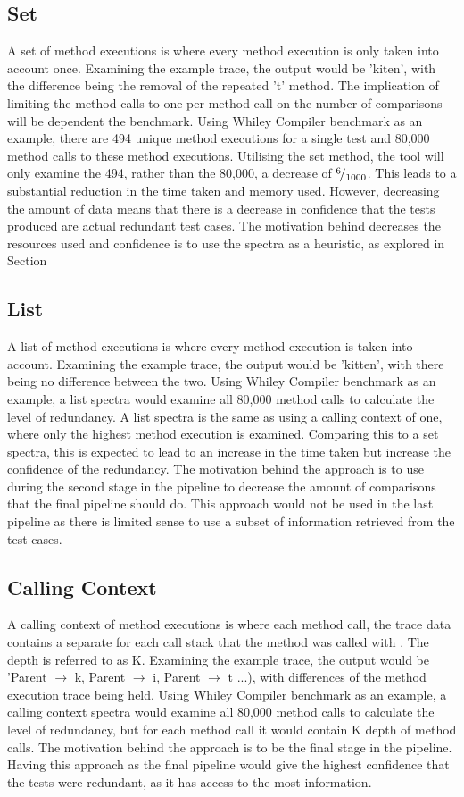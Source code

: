 \subsection{Set}
A set of method executions is where every method execution is only taken into account once. Examining the example trace, the output would be 'kiten', with the difference being the removal of the repeated 't' method. The implication of limiting the method calls to one per method call on the number of comparisons will be dependent the benchmark. Using Whiley Compiler benchmark as an example, there are 494 unique method executions for a single test and 80,000 method calls to these method executions. Utilising the set method, the tool will only examine the 494, rather than the 80,000, a decrease of ${}^{6}\!/_{1000}$. This leads to a substantial reduction in the time taken and memory used. However, decreasing the amount of data means that there is a decrease in confidence that the tests produced are actual redundant test cases. The motivation behind decreases the resources used and confidence is to use the spectra as a heuristic, as explored in Section 

\subsection{List}
A list of method executions is where every method execution is taken into account. Examining the example trace, the output would be 'kitten', with there being no difference between the two. Using Whiley Compiler benchmark as an example, a list spectra would examine all 80,000 method calls to calculate the level of redundancy. A list spectra is the same as using a calling context of one, where only the highest method execution is examined. Comparing this to a set spectra, this is expected to lead to an increase in the time taken but increase the confidence of the redundancy. The motivation behind the approach is to use during the second stage in the pipeline to decrease the amount of comparisons that the final pipeline should do. This approach would not be used in the last pipeline as there is limited sense to use a subset of information retrieved from the test cases.

\subsection{Calling Context}
A calling context of method executions is where each method call, the trace data contains a separate  for each call stack that the method was called with \cite{callingcontext}. The depth is referred to as K. Examining the example trace, the output would be 'Parent $\rightarrow$ k, Parent $\rightarrow$ i, Parent $\rightarrow$ t ...), with differences of the method execution trace being held. Using Whiley Compiler benchmark as an example, a calling context spectra would examine all 80,000 method calls to calculate the level of redundancy, but for each method call it would contain K depth of method calls. The motivation behind the approach is to be the final stage in the pipeline. Having this approach as the final pipeline would give the highest confidence that the tests were redundant, as it has access to the most information.
